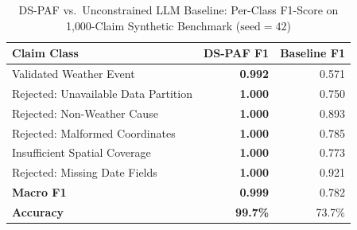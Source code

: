 \begin{table}[t]
\centering
\caption{DS-PAF vs.\ Unconstrained LLM Baseline: Per-Class F1-Score on 1{,}000-Claim Synthetic Benchmark ($\text{seed}=42$)}
\label{tab:benchmark}
\begin{tabular}{lrr}
\hline
\textbf{Claim Class} & \textbf{DS-PAF F1} & \textbf{Baseline F1} \\
\hline
Validated Weather Event & \textbf{0.992} & 0.571 \\
Rejected: Unavailable Data Partition & \textbf{1.000} & 0.750 \\
Rejected: Non-Weather Cause & \textbf{1.000} & 0.893 \\
Rejected: Malformed Coordinates & \textbf{1.000} & 0.785 \\
Insufficient Spatial Coverage & \textbf{1.000} & 0.773 \\
Rejected: Missing Date Fields & \textbf{1.000} & 0.921 \\
\hline
\textbf{Macro F1} & \textbf{0.999} & 0.782 \\
\textbf{Accuracy} & \textbf{99.7\%} & 73.7\% \\
\hline
\end{tabular}
\end{table}